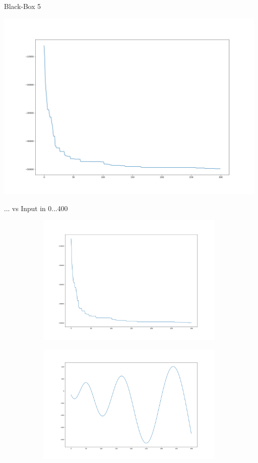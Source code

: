 \documentclass{ocbeameruni}
\begin{document}
\begin{frame}{Black-Box 5}
    \begin{center}
    \includegraphics[scale=0.25]{plots/bb5_2.png}
    \end{center}
\end{frame}


\begin{frame}{... vs Input in 0...400}
\begin{figure}
\centering
\begin{subfigure}
  \centering
  \includegraphics[width=.5\linewidth]{plots/bb5_2.png}
\end{subfigure}
\begin{subfigure}
  \centering
  \includegraphics[width=.5\linewidth]{plots/bb5_distr.png}
\end{subfigure}
\end{figure}
\end{frame}
\end{document}

